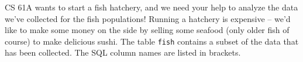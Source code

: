 CS 61A wants to start a fish hatchery, and we need your help to analyze the data we've collected for the fish populations! Running a hatchery is expensive -- we'd like to make some money on the side by selling some seafood (only older fish of course) to make delicious sushi. \newline
\newline
The table \lstinline$fish$ contains a subset of the data that has been collected. The SQL column names are listed in brackets. \newline
